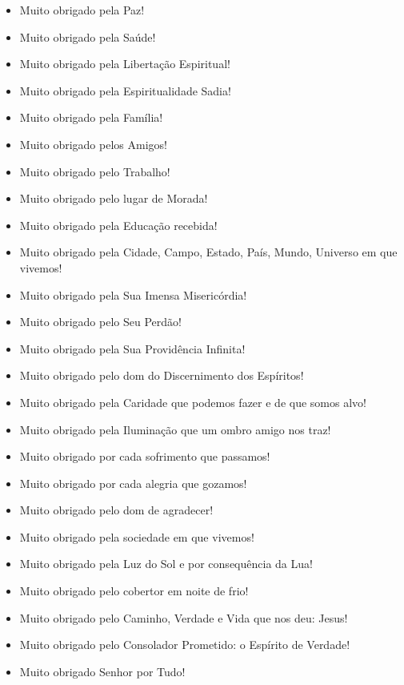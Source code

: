 \begin{itemize}
    \item Muito obrigado pela Paz!
    \item Muito obrigado pela Saúde!
    \item Muito obrigado pela Libertação Espiritual!
    \item Muito obrigado pela Espiritualidade Sadia!
    \item Muito obrigado pela Família!
    \item Muito obrigado pelos Amigos!
    \item Muito obrigado pelo Trabalho!
    \item Muito obrigado pelo lugar de Morada!
    \item Muito obrigado pela Educação recebida!
    \item Muito obrigado pela Cidade, Campo, Estado, País, Mundo, Universo em que vivemos!
    \item Muito obrigado pela Sua Imensa Misericórdia!
    \item Muito obrigado pelo Seu Perdão!
    \item Muito obrigado pela Sua Providência Infinita!
    \item Muito obrigado pelo dom do Discernimento dos Espíritos!
    \item Muito obrigado pela Caridade que podemos fazer e de que somos alvo!
    \item Muito obrigado pela Iluminação que um ombro amigo nos traz!
    \item Muito obrigado por cada sofrimento que passamos!
    \item Muito obrigado por cada alegria que gozamos!
    \item Muito obrigado pelo dom de agradecer!
    \item Muito obrigado pela sociedade em que vivemos!
    \item Muito obrigado pela Luz do Sol e por consequência da Lua!
    \item Muito obrigado pelo cobertor em noite de frio!
    \item Muito obrigado pelo Caminho, Verdade e Vida que nos deu: Jesus!
    \item Muito obrigado pelo Consolador Prometido: o Espírito de Verdade!
    \item Muito obrigado Senhor por Tudo!
\end{itemize}

